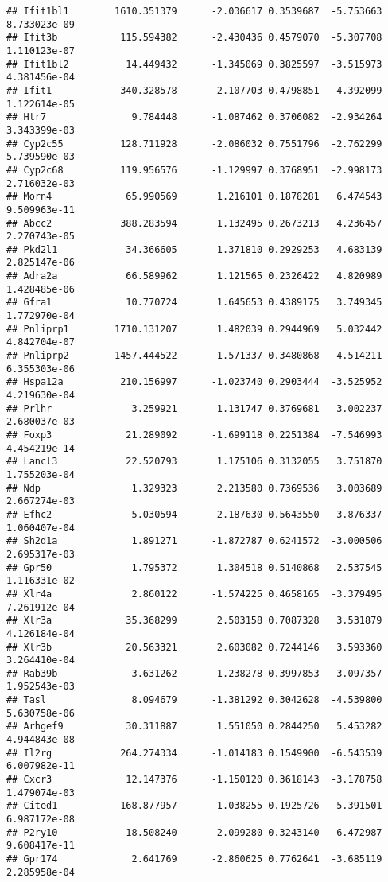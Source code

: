 \documentclass[
]{article}
\begin{document}
\begin{verbatim}
## Ifit1bl1        1610.351379      -2.036617 0.3539687  -5.753663 8.733023e-09
## Ifit3b           115.594382      -2.430436 0.4579070  -5.307708 1.110123e-07
## Ifit1bl2          14.449432      -1.345069 0.3825597  -3.515973 4.381456e-04
## Ifit1            340.328578      -2.107703 0.4798851  -4.392099 1.122614e-05
## Htr7               9.784448      -1.087462 0.3706082  -2.934264 3.343399e-03
## Cyp2c55          128.711928      -2.086032 0.7551796  -2.762299 5.739590e-03
## Cyp2c68          119.956576      -1.129997 0.3768951  -2.998173 2.716032e-03
## Morn4             65.990569       1.216101 0.1878281   6.474543 9.509963e-11
## Abcc2            388.283594       1.132495 0.2673213   4.236457 2.270743e-05
## Pkd2l1            34.366605       1.371810 0.2929253   4.683139 2.825147e-06
## Adra2a            66.589962       1.121565 0.2326422   4.820989 1.428485e-06
## Gfra1             10.770724       1.645653 0.4389175   3.749345 1.772970e-04
## Pnliprp1        1710.131207       1.482039 0.2944969   5.032442 4.842704e-07
## Pnliprp2        1457.444522       1.571337 0.3480868   4.514211 6.355303e-06
## Hspa12a          210.156997      -1.023740 0.2903444  -3.525952 4.219630e-04
## Prlhr              3.259921       1.131747 0.3769681   3.002237 2.680037e-03
## Foxp3             21.289092      -1.699118 0.2251384  -7.546993 4.454219e-14
## Lancl3            22.520793       1.175106 0.3132055   3.751870 1.755203e-04
## Ndp                1.329323       2.213580 0.7369536   3.003689 2.667274e-03
## Efhc2              5.030594       2.187630 0.5643550   3.876337 1.060407e-04
## Sh2d1a             1.891271      -1.872787 0.6241572  -3.000506 2.695317e-03
## Gpr50              1.795372       1.304518 0.5140868   2.537545 1.116331e-02
## Xlr4a              2.860122      -1.574225 0.4658165  -3.379495 7.261912e-04
## Xlr3a             35.368299       2.503158 0.7087328   3.531879 4.126184e-04
## Xlr3b             20.563321       2.603082 0.7244146   3.593360 3.264410e-04
## Rab39b             3.631262       1.238278 0.3997853   3.097357 1.952543e-03
## Tasl               8.094679      -1.381292 0.3042628  -4.539800 5.630758e-06
## Arhgef9           30.311887       1.551050 0.2844250   5.453282 4.944843e-08
## Il2rg            264.274334      -1.014183 0.1549900  -6.543539 6.007982e-11
## Cxcr3             12.147376      -1.150120 0.3618143  -3.178758 1.479074e-03
## Cited1           168.877957       1.038255 0.1925726   5.391501 6.987172e-08
## P2ry10            18.508240      -2.099280 0.3243140  -6.472987 9.608417e-11
## Gpr174             2.641769      -2.860625 0.7762641  -3.685119 2.285958e-04

\end{verbatim}
\end{document}
